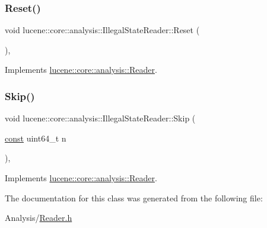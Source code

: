 \mbox{\label{classlucene_1_1core_1_1analysis_1_1IllegalStateReader_a7c457898d46f0dcf7de18a1730330c02}} 
\subsubsection{\texorpdfstring{Reset()}{Reset()}}
{\footnotesize\ttfamily void lucene\+::core\+::analysis\+::\+Illegal\+State\+Reader\+::\+Reset (\begin{DoxyParamCaption}{ }\end{DoxyParamCaption})\hspace{0.3cm}{\ttfamily [inline]}, {\ttfamily [virtual]}}



Implements \mbox{\hyperlink{classlucene_1_1core_1_1analysis_1_1Reader_a5299f5469ce4ea9812ec79a59667945a}{lucene\+::core\+::analysis\+::\+Reader}}.

\mbox{\label{classlucene_1_1core_1_1analysis_1_1IllegalStateReader_aa2a34d98ca51e81297960b13aa0fa18e}} 
\subsubsection{\texorpdfstring{Skip()}{Skip()}}
{\footnotesize\ttfamily void lucene\+::core\+::analysis\+::\+Illegal\+State\+Reader\+::\+Skip (\begin{DoxyParamCaption}\item[{\mbox{\hyperlink{ZlibCrc32_8h_a2c212835823e3c54a8ab6d95c652660e}{const}} uint64\+\_\+t}]{n }\end{DoxyParamCaption})\hspace{0.3cm}{\ttfamily [inline]}, {\ttfamily [virtual]}}



Implements \mbox{\hyperlink{classlucene_1_1core_1_1analysis_1_1Reader_a3bd8e9f3e1d07d698bccabde41970219}{lucene\+::core\+::analysis\+::\+Reader}}.



The documentation for this class was generated from the following file\+:\begin{DoxyCompactItemize}
\item 
Analysis/\mbox{\hyperlink{Reader_8h}{Reader.\+h}}\end{DoxyCompactItemize}
